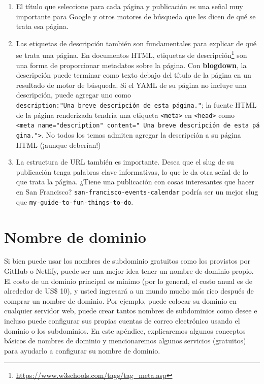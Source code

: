 \documentclass[12pt,]{krantz}
\renewcommand{\href}[2]{#2\footnote{\url{#1}}}
\theoremstyle{definition}
\theoremstyle{definition}
\theoremstyle{definition}
\theoremstyle{remark}
\begin{document}
\begin{enumerate}
\def\labelenumi{\arabic{enumi}.}
\item
  El título que seleccione para cada página y publicación es una señal
  muy importante para Google y otros motores de búsqueda que les dicen
  de qué se trata esa página.
\item
  Las etiquetas de descripción también son fundamentales para explicar
  de qué se trata una página. En documentos HTML,
  \href{https://www.w3schools.com/tags/tag_meta.asp}{etiquetas de
  descripción} son una forma de proporcionar metadatos sobre la página.
  Con \textbf{blogdown}, la descripción puede terminar como texto debajo
  del título de la página en un resultado de motor de búsqueda. Si el
  YAML de su página no incluye una descripción, puede agregar uno como
  \texttt{description:"Una\ breve\ descripción\ de\ esta\ página."}; la
  fuente HTML de la página renderizada tendría una etiqueta
  \texttt{\textless{}meta\textgreater{}} en
  \texttt{\textless{}head\textgreater{}} como
  \texttt{\textless{}meta\ name="description"\ content="\ Una\ breve\ descripción\ de\ esta\ página."\textgreater{}}.
  No todos los temas admiten agregar la descripción a su página HTML
  (¡aunque deberían!)
\item
  La estructura de URL también es importante. Desea que el slug de su
  publicación tenga palabras clave informativas, lo que le da otra señal
  de lo que trata la página. ¿Tiene una publicación con cosas
  interesantes que hacer en San Francisco?
  \texttt{san-francisco-events-calendar} podría ser un mejor slug que
  \texttt{my-guide-to-fun-things-to-do}.
\end{enumerate}

\hypertarget{nombre-de-dominio}{%
\chapter{Nombre de dominio}\label{nombre-de-dominio}}

Si bien puede usar los nombres de subdominio gratuitos
 como los provistos por GitHub o Netlify, puede
ser una mejor idea tener un nombre de dominio propio. El costo de un
dominio principal es mínimo (por lo general, el costo anual es de
alrededor de US\$ 10), y usted ingresará a un mundo mucho más rico
después de comprar un nombre de dominio. Por ejemplo, puede colocar su
dominio en cualquier servidor web, puede crear tantos nombres de
subdominios como desee e incluso puede configurar sus propias cuentas de
correo electrónico usando el dominio o los subdominios. En este
apéndice, explicaremos algunos conceptos básicos de nombres de dominio y
mencionaremos algunos servicios (gratuitos) para ayudarlo a configurar
su nombre de dominio.
\end{document}
